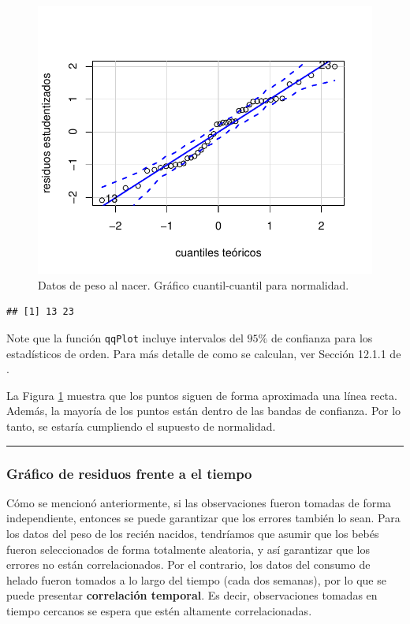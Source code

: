 \documentclass[
]{article}
\begin{document}
\begin{figure}

{\centering \includegraphics{MLGI_files/figure-latex/qqnormBWdata1-1} 

}

\caption{Datos de peso al nacer. Gráfico cuantil-cuantil para normalidad.}\label{fig:qqnormBWdata1}
\end{figure}

\begin{verbatim}
## [1] 13 23
\end{verbatim}

Note que la función \texttt{qqPlot} incluye intervalos del \(95\%\) de confianza para los estadísticos de orden. Para más detalle de como se calculan, ver Sección 12.1.1 de \citet{fox_applied_2016}.

La Figura \ref{fig:qqnormBWdata1} muestra que los puntos siguen de forma aproximada una línea recta. Además, la mayoría de los puntos están dentro de las bandas de confianza. Por lo tanto, se estaría cumpliendo el supuesto de normalidad.

\rule{\textwidth}{0.4pt}

\hypertarget{gruxe1fico-de-residuos-frente-a-el-tiempo}{%
\subsubsection{Gráfico de residuos frente a el tiempo}\label{gruxe1fico-de-residuos-frente-a-el-tiempo}}

Cómo se mencionó anteriormente, si las observaciones fueron tomadas de forma independiente, entonces se puede garantizar que los errores también lo sean. Para los datos del peso de los recién nacidos, tendríamos que asumir que los bebés fueron seleccionados de forma totalmente aleatoria, y así garantizar que los errores no están correlacionados. Por el contrario, los datos del consumo de helado fueron tomados a lo largo del tiempo (cada dos semanas), por lo que se puede presentar \textbf{correlación temporal}. Es decir, observaciones tomadas en tiempo cercanos se espera que estén altamente correlacionadas.
\end{document}
